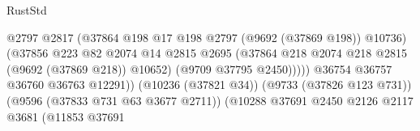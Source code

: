 \begin{lexlean}{RustStd}
\begin{coremodule}
                                                          @2797
                                                          @2817
                                                          (@37864
                                                            @198
                                                            @17
                                                            @198
                                                            @2797
                                                            (@9692 (@37869 @198))
                                                            @10736)
                                                          (@37856
                                                            @223
                                                            @82
                                                            @2074
                                                            @14
                                                            @2815
                                                            @2695
                                                            (@37864
                                                              @218
                                                              @2074
                                                              @218
                                                              @2815
                                                              (@9692 (@37869 @218))
                                                              @10652)
                                                            (@9709 @37795 @2450)))))
                                                    @36754
                                                    @36757
                                                    @36760
                                                    @36763
                                                    @12291))
                                                (@10236 (@37821 @34))
                                                (@9733 (@37826 @123 @731))
                                                (@9596 (@37833 @731 @63 @3677 @2711))
                                                (@10288
                                                  @37691
                                                  @2450
                                                  @2126
                                                  @2117
                                                  @3681
                                                  (@11853
                                                    @37691

\end{coremodule}
\end{lexlean}
